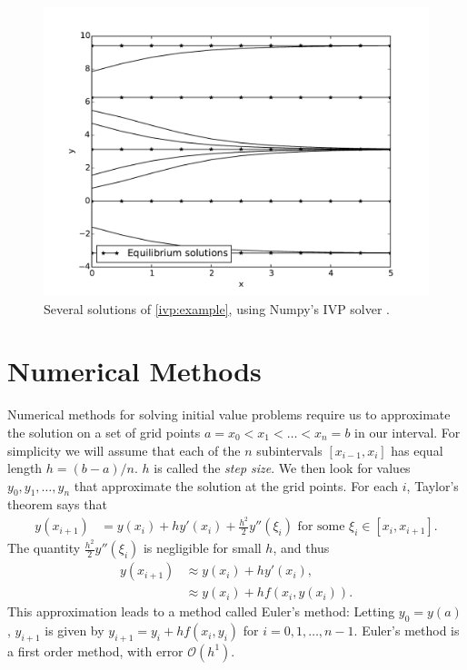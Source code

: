 \begin{figure}
\centering
\includegraphics[width=\textwidth]{example.pdf}
\caption{Several solutions of \eqref{ivp:example}, using Numpy's IVP solver . }
\label{ivp:int_curves}
\end{figure}


\section*{Numerical Methods}
Numerical methods for solving initial value problems require us to approximate the solution on a set of grid points $a = x_0< x_1<\hdots< x_n = b$ in our interval.  
For simplicity we will assume that each of the $n$ subintervals $[x_{i-1},x_i]$ has equal length $h = (b-a)/n$. $h$ is called the \textit{step size}. 
We then look for values $y_0, y_1, \hdots, y_n$ that approximate the solution at the grid points.
For each $i$, Taylor's theorem says that
\begin{align*}
y(x_{i+1}) &= y(x_{i}) + h y'(x_i) + \frac{h^2}{2} y''(\xi_i)\text{ for some }\xi_i \in [x_i,x_{i+1}].
\end{align*}
The quantity $\frac{h^2}{2} y''(\xi_i)$ is negligible for small $h$, and thus
\begin{align*}
y(x_{i+1}) &\approx y(x_{i}) + h y'(x_i)  ,\\
&\approx y(x_{i}) + h f(x_i,y(x_i)).
\end{align*}
This approximation leads to a method called Euler's method: Letting $y_0 = y(a)$, $y_{i+1}$ is given by $y_{i+1} = y_i +hf(x_i,y_i)$ for $i = 0, 1, \hdots, n-1$.
Euler's method is a first order method, with error $\mathcal{O}(h^1)$.

